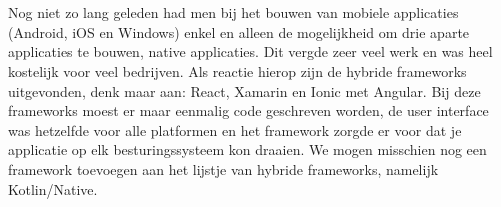 %
%

%



\chapter*{}

Nog niet zo lang geleden had men bij het bouwen van mobiele applicaties (Android, iOS en Windows) enkel en alleen de mogelijkheid om drie aparte applicaties te bouwen, native applicaties. Dit vergde zeer veel werk en was heel kostelijk voor veel bedrijven. Als reactie hierop zijn de hybride frameworks uitgevonden, denk maar aan: React, Xamarin en Ionic met Angular. Bij deze frameworks moest er maar eenmalig code geschreven worden, de user interface was hetzelfde voor alle platformen en het framework zorgde er voor dat je applicatie op elk besturingssysteem kon draaien. We mogen misschien nog een framework toevoegen aan het lijstje van hybride frameworks, namelijk Kotlin/Native.

